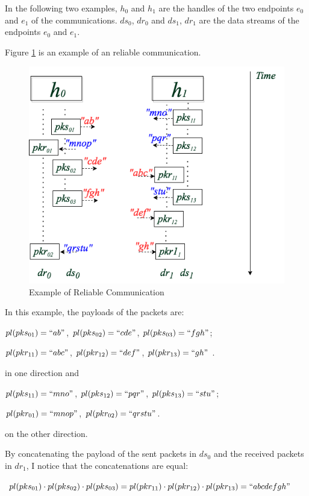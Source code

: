 In the following two examples, $h_0$ and $h_1$ are the handles of the two endpoints $e_0$ and $e_1$ of the communications. $ds_0$, $dr_0$ and $ds_1$, $dr_1$ are the data streams of the endpoints $e_0$ and $e_1$. 

Figure \ref{reliableexample} is an example of an reliable communication. 

\begin{figure}[H]
\centerline{\includegraphics[scale=0.5]{Figures/reliableexample}}
\caption{Example of Reliable Communication}
\label{reliableexample}
\end{figure}

In this example, the payloads of the packets are:

$pl(pks_{01})=``ab"$, $ pl(pks_{02})=``cde"$, $pl(pks_{03})=``fgh"$;

$pl(pkr_{11})=``abc"$, $pl(pkr_{12})=``def"$, $pl(pkr_{13})=``gh"$ .

in one direction and 

$pl(pks_{11})=``mno"$, $pl(pks_{12})=``pqr"$, $pl(pks_{13})=``stu"$;

$pl(pkr_{01})=``mnop"$, $pl(pkr_{02})=``qrstu"$. 

on the other direction. 

By concatenating the payload of the sent packets in $ds_0$ and the received packets in $dr_1$, I notice that the concatenations are equal: 

$pl(pks_{01}) \cdot pl(pks_{02}) \cdot pl(pks_{03}) = pl(pkr_{11}) \cdot pl(pkr_{12}) \cdot pl(pkr_{13}) = ``abcdefgh"$ 

